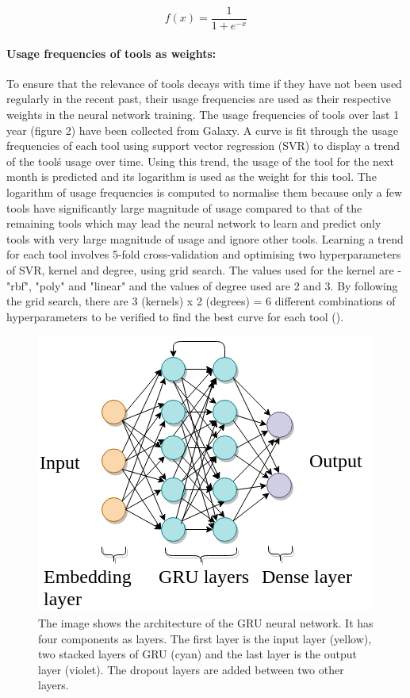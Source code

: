 \documentclass{bioinfo}
\begin{document}
\begin{equation}
f(x) = \frac{1}{1 + e^{-x}}
\end{equation}

\paragraph*{Usage frequencies of tools as weights:}
To ensure that the relevance of tools decays with time if they have not been used regularly in the recent past, their usage frequencies are used as their respective weights in the neural network training. The usage frequencies of tools over last 1 year (figure 2) have been collected from Galaxy. A curve is fit through the usage frequencies of each tool using support vector regression (SVR) to display a trend of the tool\'s usage over time. Using this trend, the usage of the tool for the next month is predicted and its logarithm is used as the weight for this tool. The logarithm of usage frequencies is computed to normalise them because only a few tools have significantly large magnitude of usage compared to that of the remaining tools which may lead the neural network to learn and predict only tools with very large magnitude of usage and ignore other tools. Learning a trend for each tool involves 5-fold cross-validation and optimising two hyperparameters of SVR, kernel and degree, using grid search. The values used for the kernel are - "rbf", "poly" and "linear" and the values of degree used are 2 and 3. By following the grid search, there are 3 (kernels) x 2 (degrees) = 6 different combinations of hyperparameters to be verified to find the best curve for each tool (\cite{scikitlearn}).

\begin{figure}
\centerline{\includegraphics[scale=0.25]{bioinformatics_journal/images/gru_architecture.png}}
\caption{The image shows the architecture of the GRU neural network. It has four components as layers. The first layer is the input layer (yellow), two stacked layers of GRU (cyan) and the last layer is the output layer (violet). The dropout layers are added between two other layers.}\label{figure:03}
\end{figure}
\end{document}
